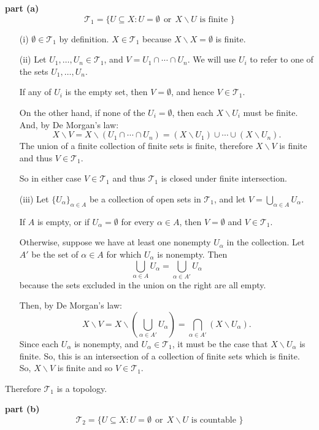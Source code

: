 \documentclass{homework}
\newcommand{\Tau}{\ensuremath{\mathcal{T}}}
\newcommand{\OR}{\ensuremath{\ \ \text{or}\ \ }}
\begin{document}
\textbf{part (a)}\\
$$ \Tau_1 = \{ U \subseteq X : U=\emptyset \OR X\backslash U
                               \text{ is finite } \} $$

\begin{itemize}
\item[(i)] $\emptyset\in\Tau_1$ by definition.  $X\in\Tau_1$
because $X\backslash X=\emptyset$ is finite.
\item[(ii)] Let $U_1,\ldots,U_n\in\Tau_1$, and $V=U_1\cap\cdots\cap U_n$.
We will use $U_i$ to refer to one of the sets $U_1,\ldots,U_n$.

If any of $U_i$ is the empty set, then $V=\emptyset$,
and hence $V\in\Tau_1$.

On the other hand, if none of the $U_i=\emptyset$, then
each $X\backslash U_i$ must be finite.  And, by De Morgan's law:
$$ X\backslash V = X\backslash(U_1\cap\cdots\cap U_n) =
 (X\backslash U_1) \cup \cdots \cup (X\backslash U_n).$$
The union of a finite collection of finite sets is finite, therefore
$X\backslash V$ is finite and thus $V\in\Tau_1$.

So in either case $V\in\Tau_1$ and thus $\Tau_1$ is closed under
finite intersection.
\item[(iii)] Let $\{U_\alpha\}_{\alpha\in A}$ be a collection
of open sets in $\Tau_1$, and let $V=\bigcup_{\alpha\in A} U_\alpha$.

If $A$ is empty, or if $U_\alpha=\emptyset$ for every $\alpha\in A$,
then $V=\emptyset$ and $V\in\Tau_1$.

Otherwise, suppose we have at least one nonempty $U_\alpha$ in
the collection.  Let $A'$ be the set of $\alpha\in A$ for which $U_\alpha$ is
nonempty.  Then
$$ \bigcup_{\alpha\in A} U_\alpha = \bigcup_{\alpha\in A'} U_\alpha $$
because the sets excluded in the union on the right are all empty.

Then, by De Morgan's law:
$$ X\backslash V = X\backslash \left(\bigcup_{\alpha\in A'} U_\alpha\right) =
 \bigcap_{\alpha\in A'}\left(X\backslash U_\alpha\right). $$
Since each $U_\alpha$ is nonempty, and $U_\alpha\in\Tau_1$, it must be
the case that $X\backslash U_\alpha$ is finite. So, this is an
intersection of a collection of finite sets which is finite.
So, $X\backslash V$ is finite and so $V\in\Tau_1$.
\end{itemize}
Therefore $\Tau_1$ is a topology.

\textbf{part (b)}\\
$$ \Tau_2 = \{ U \subseteq X : U=\emptyset \OR X\backslash U
                               \text{ is countable } \} $$
\end{document}
